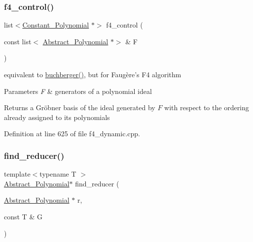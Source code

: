 \subsubsection{\texorpdfstring{f4\+\_\+control()}{f4\_control()}}
{\footnotesize\ttfamily list$<$\hyperlink{group__polygroup_class_constant___polynomial}{Constant\+\_\+\+Polynomial} $\ast$$>$ f4\+\_\+control (\begin{DoxyParamCaption}\item[{const list$<$ \hyperlink{group__polygroup_class_abstract___polynomial}{Abstract\+\_\+\+Polynomial} $\ast$$>$ \&}]{F }\end{DoxyParamCaption})}



equivalent to {\ttfamily \hyperlink{group___g_b_computation_ga37aa7e2fec96fac6c914934a4243f603}{buchberger()}}, but for Faug\`{e}re's F4 algorithm 


\begin{DoxyParams}{Parameters}
{\em F} & generators of a polynomial ideal \\
\hline
\end{DoxyParams}
\begin{DoxyReturn}{Returns}
a Gr\"{o}bner basis of the ideal generated by $ F $ with respect to the ordering already assigned to its polynomials 
\end{DoxyReturn}


Definition at line 625 of file f4\+\_\+dynamic.\+cpp.

\mbox{\label{group___g_b_computation_ga5a0f37dcb4ac73e553793fd627941c48}} 
\subsubsection{\texorpdfstring{find\+\_\+reducer()}{find\_reducer()}}
{\footnotesize\ttfamily template$<$typename T $>$ \\
\hyperlink{group__polygroup_class_abstract___polynomial}{Abstract\+\_\+\+Polynomial}$\ast$ find\+\_\+reducer (\begin{DoxyParamCaption}\item[{\hyperlink{group__polygroup_class_abstract___polynomial}{Abstract\+\_\+\+Polynomial} $\ast$}]{r,  }\item[{const T \&}]{G }\end{DoxyParamCaption})}



